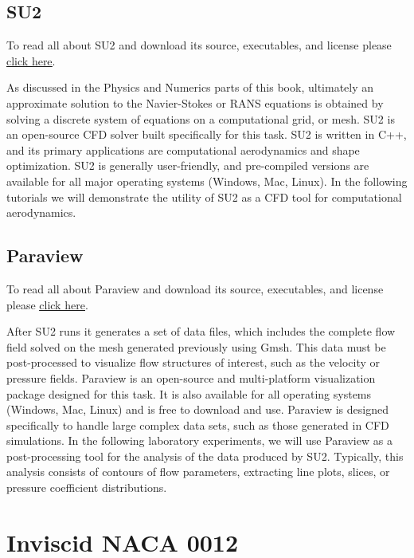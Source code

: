 \section{SU2}
\begin{su2note}
	To read all about SU2 and download its source, executables, and license please \href{https://su2code.github.io/}{\underline{click here}}.
\end{su2note}
As discussed in the Physics and Numerics parts of this book, ultimately an approximate solution to the Navier-Stokes or RANS equations is obtained by solving a discrete system of equations on a computational grid, or mesh. SU2 is an open-source CFD solver built specifically for this task. SU2 is written in C++, and its primary applications are computational aerodynamics and shape optimization. SU2 is generally user-friendly, and pre-compiled versions are available for all major operating systems (Windows, Mac, Linux). In the following tutorials we will demonstrate the utility of SU2 as a CFD tool for computational aerodynamics.

\section{Paraview}
\begin{paraviewnote}
	To read all about Paraview and download its source, executables, and license please \href{https://www.paraview.org/}{\underline{click here}}.
\end{paraviewnote}
After SU2 runs it generates a set of data files, which includes the complete flow field solved on the mesh generated previously using Gmsh. This data must be post-processed to visualize flow structures of interest, such as the velocity or pressure fields. Paraview is an open-source and multi-platform visualization package designed for this task. It is also available for all operating systems (Windows, Mac, Linux) and is free to download and use. Paraview is designed specifically to handle large complex data sets, such as those generated in CFD simulations. In the following laboratory experiments, we will use Paraview as a post-processing tool for the analysis of the data produced by SU2. Typically, this analysis consists of contours of flow parameters, extracting line plots, slices, or pressure coefficient distributions.

 \chapter{Inviscid NACA 0012}
\label{ch:Inviscid NACA 0012}
